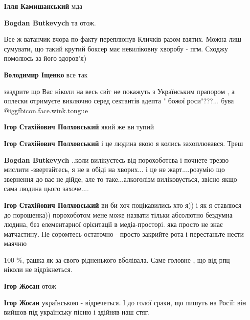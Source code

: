 \begin{itemize}
\begin{itemize} %
\textbf{Ілля Камишанський} мда

\textbf{Bogdan Butkevych} та отож.
\end{itemize} %


Все ж ватанчик вчора по-факту переплюнув Кличків разом взятих. Можна лиш
сумувати, що такий крутий боксер має невиліковну хворобу - пгм. Сходжу помолюсь
за його здоров'я)

\begin{itemize} %
\textbf{Володимир Іщенко} все так
\end{itemize} %


заздрите що Вас ніколи на весь світ не покажуть з Українським прапором , а
оплески отримуєте виключно серед сектантів адепта " божої роси"???... бува @igg{fbicon.face.wink.tongue} 

\begin{itemize} %
\textbf{Ігор Стахійович Полховський} який же ви тупий


\textbf{Ігор Стахійович Полховський} і це людина якою я колись захоплювався. Треш

\textbf{Bogdan Butkevych} ..коли вилікуєтесь від порохоботсва і почнете трезво мислити -звертайтесь, я не в обіді на хворих... і це не жарт....розумію що звернення до вас не дійде, але то таке...алкоголізм виліковується, звісно якщо сама людина цього захоче....


\textbf{Ігор Стахійович Полховський} ви би хоч поцікавились хто я)) і як я ставлюся до порошенка)) порохоботом мене може назвати тільки абсолютно бездумна людина, без елементарної орієнтації в медіа-просторі. яка просто не знає матчастину. Не соромтесь остаточно - просто закрийте рота і перестаньте нести маячню
\end{itemize} %

100 \%, рашка як за свого рідненького вболівала. Саме головне , що від рпц ніколи не відрікнеться.

\begin{itemize} %
\textbf{Ігор Жосан} отож

\textbf{Ігор Жосан} українською - відречеться. І до голої сраки, що пишуть на Росії: він вийшов під українську пісню і здійняв наш стяг.


\end{itemize}
\end{itemize}
